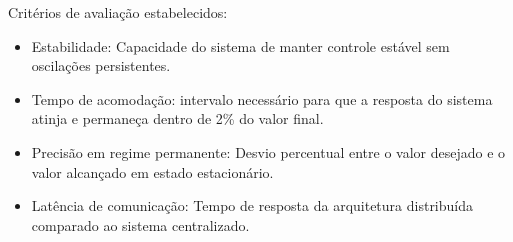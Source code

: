Critérios de avaliação estabelecidos:

\begin{itemize}
\item Estabilidade: Capacidade do sistema de manter controle estável sem oscilações persistentes.
\item Tempo de acomodação: intervalo necessário para que a resposta do sistema atinja e permaneça dentro de 2\% do valor final.
\item Precisão em regime permanente: Desvio percentual entre o valor desejado e o valor alcançado em estado estacionário.
\item Latência de comunicação: Tempo de resposta da arquitetura distribuída comparado ao sistema centralizado.
\end{itemize}

